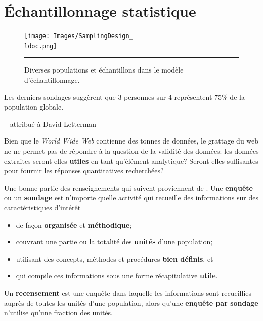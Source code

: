 \newpage
\section{Échantillonnage statistique}
\begin{figure}[t]
\centering
\texttt{[image: Images/SamplingDesign\_\\ldoc.png]}
\caption{\small Diverses populations et échantillons dans le modèle d'échantillonnage.} \hrule\label{fig:sammod}
\end{figure}

\begin{tcolorbox}[title=On ne peut pas d\'emontrer le contraire...]
Les derniers sondages suggèrent que 3 personnes sur 4 représentent 75\% de la population globale.\\[-0.6cm]
\begin{flushright}
-- attribu\'e \`a David Letterman
\end{flushright}
\end{tcolorbox}
\noindent
Bien que le \textit{World Wide Web} contienne des tonnes de données, le grattage du web ne ne permet pas de répondre à la question de la validité des données: les données extraites seront-elles \textbf{utiles} en tant qu'élément analytique? Seront-elles suffisantes pour fournir les réponses quantitatives recherchées? 

Une bonne partie des renseignements qui suivent proviennent de \cite{DC_F,DC_SC}. Une \textbf{enquête} ou un \textbf{sondage} est n'importe quelle activité qui recueille des informations sur des caractéristiques d'intérêt 
\begin{itemize}[noitemsep] 
\item de façon \textbf{organisée} et \textbf{méthodique};
\item couvrant une partie ou la totalité des \textbf{unités} d'une population;
\item utilisant des concepts, méthodes et procédures \textbf{bien définis}, et
\item qui compile ces informations sous une forme récapitulative \textbf{utile}. 
\end{itemize}
Un \textbf{recensement} est une enquête dans laquelle les informations sont recueillies auprès de toutes les unités d'une population, alors qu'une \textbf{enquête par sondage} n'utilise qu'une fraction des unités. 
